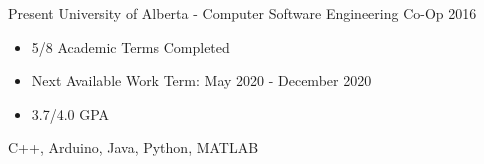 
  

\begin{experiences}
    \experience
      {Present}   {University of Alberta - Computer Software Engineering Co-Op}{}{}
      {2016} {
                        \begin{itemize}
                          \item 5/8 Academic Terms Completed
                          \item Next Available Work Term: May 2020 - December 2020
			  \item 3.7/4.0 GPA
                        \end{itemize}
                      }
                      {
                        C++,
                        Arduino,
                        Java,
                        Python,
                        MATLAB
                      }
  
  \end{experiences}
